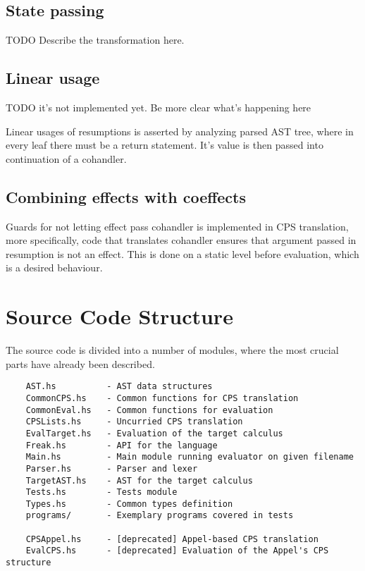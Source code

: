 \documentclass[declaration,shortabstract]{iithesis}
\theoremstyle{definition} \newtheorem{definition}{Definition}[chapter]
\theoremstyle{remark} \newtheorem{remark}[definition]{Observation}
\theoremstyle{plain} \newtheorem{theorem}[definition]{Theorem}
\theoremstyle{plain} \newtheorem{lemma}[definition]{Lemma}
\begin{document}
    \subsection{State passing}

    TODO Describe the transformation here.

    \subsection{Linear usage}

    TODO it's not implemented yet. Be more clear what's happening here

    Linear usages of resumptions is asserted by analyzing parsed AST tree,
    where in every leaf there must be a return statement. It's value is then
    passed into continuation of a cohandler.

    \subsection{Combining effects with coeffects}

    Guards for not letting effect pass cohandler is implemented in CPS
    translation, more specifically, code that translates cohandler ensures that
    argument passed in resumption is not an effect. This is done on a static
    level before evaluation, which is a desired behaviour.

    \section{Source Code Structure}

    The source code is divided into a number of modules, where the most
    crucial parts have already been described.

\begin{verbatim}
    AST.hs          - AST data structures
    CommonCPS.hs    - Common functions for CPS translation
    CommonEval.hs   - Common functions for evaluation
    CPSLists.hs     - Uncurried CPS translation
    EvalTarget.hs   - Evaluation of the target calculus
    Freak.hs        - API for the language
    Main.hs         - Main module running evaluator on given filename
    Parser.hs       - Parser and lexer
    TargetAST.hs    - AST for the target calculus
    Tests.hs        - Tests module
    Types.hs        - Common types definition
    programs/       - Exemplary programs covered in tests

    CPSAppel.hs     - [deprecated] Appel-based CPS translation
    EvalCPS.hs      - [deprecated] Evaluation of the Appel's CPS structure
\end{verbatim}
\end{document}
